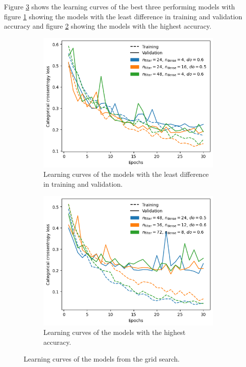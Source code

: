 Figure \ref{fig:gridsearchLearningCurves} shows the learning curves of the best three performing models with figure \ref{fig:SmallestDelta_LearningCurves} showing the models with the least difference in training and validation accuracy and figure \ref{fig:HighestAccuracyLearningCurves} showing the models with the highest accuracy.
\begin{figure}
    \centering
    \begin{subfigure}[B]{.45\textwidth}   %
        \centering
        \includegraphics[width=\linewidth]{plots/SmallestDelta_LearningCurves.png}
        \caption{Learning curves of the models with the least difference in training and validation.}
        \label{fig:SmallestDelta_LearningCurves}
    \end{subfigure}    
    \begin{subfigure}[B]{.45\textwidth}   %
        \centering
        \includegraphics[width=\linewidth]{plots/Best3LearningCurves.png}
        \caption{Learning curves of the models with the highest accuracy.}
        \label{fig:HighestAccuracyLearningCurves}
    \end{subfigure}
    \caption{Learning curves of the models from the grid search.}
    \label{fig:gridsearchLearningCurves}
\end{figure}
